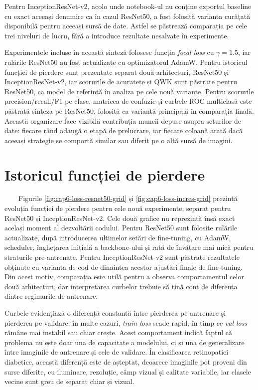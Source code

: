 \documentclass[12pt, a4paper, twoside, romanian]{teza-upb}
\begin{document}
Pentru InceptionResNet-v2, acolo unde notebook-ul nu conține exportul baseline cu exact aceeași
denumire ca în cazul ResNet50, a fost folosită varianta curățată disponibilă pentru aceeași sursă de
date. Astfel se păstrează comparația pe cele trei niveluri de lucru, fără a introduce rezultate
nesalvate în experimente.

Experimentele incluse în această sinteză folosesc funcția \textit{focal loss} cu
\(\gamma = 1.5\), iar rulările ResNet50 au fost actualizate cu optimizatorul AdamW. Pentru
istoricul funcției de pierdere sunt prezentate separat două arhitecturi, ResNet50 și
InceptionResNet-v2, iar scorurile de acuratețe și QWK sunt păstrate pentru ResNet50, ca model de
referință în analiza pe cele nouă variante. Pentru scorurile precision/recall/F1 pe clase,
matricea de confuzie și curbele ROC multiclasă este păstrată sinteza pe ResNet50, folosită ca
variantă principală în comparația finală. Această organizare face vizibilă contribuția muncii
depuse asupra seturilor de date:
fiecare rând adaugă o etapă de prelucrare, iar fiecare coloană arată dacă aceeași strategie se
comportă similar sau diferit pe o altă sursă de imagini.
\bigskip

\section{Istoricul funcției de pierdere}

\ \ \ \ Figurile \ref{fig:cap6-loss-resnet50-grid} și \ref{fig:cap6-loss-incres-grid} prezintă
evoluția funcției de pierdere pentru cele nouă experimente, separat pentru ResNet50 și
InceptionResNet-v2. Cele două grafice nu reprezintă însă exact același moment al dezvoltării codului.
Pentru ResNet50 sunt folosite rulările actualizate, după introducerea ultimelor setări de
fine-tuning, cu AdamW, scheduler, înghețarea inițială a backbone-ului și rată de învățare mai mică
pentru straturile pre-antrenate. Pentru InceptionResNet-v2 sunt păstrate rezultatele obținute cu
varianta de cod de dinaintea acestor ajustări finale de fine-tuning. Din acest motiv, comparația este
utilă pentru a observa comportamentul celor două arhitecturi, dar interpretarea curbelor trebuie să țină
cont de diferența dintre regimurile de antrenare.
\bigskip

Curbele evidențiază o diferență constantă între pierderea pe antrenare și pierderea pe validare: în
multe cazuri, \textit{train loss} scade rapid, în timp ce \textit{val loss} rămâne mai instabil sau
chiar crește. Acest comportament indică faptul că problema nu este doar una de capacitate a modelului,
ci și una de generalizare între imaginile de antrenare și cele de validare. În clasificarea
retinopatiei diabetice, această diferență este de așteptat, deoarece imaginile pot proveni din surse
diferite, cu iluminare, rezoluție, câmp vizual și calitate variabile, iar clasele vecine sunt greu de
separat chiar și vizual.
\bigskip
\end{document}
